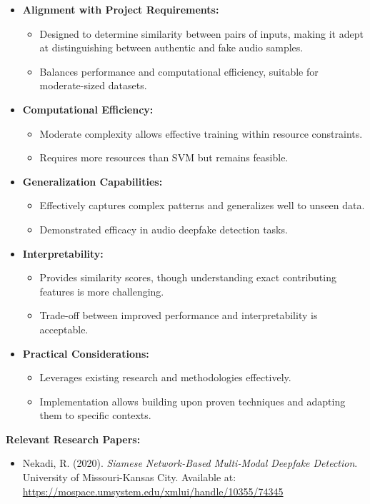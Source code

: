 \documentclass{article}
\begin{document}
\begin{itemize}
    \item \textbf{Alignment with Project Requirements:}
    \begin{itemize}
        \item Designed to determine similarity between pairs of inputs, making it adept at distinguishing between authentic and fake audio samples.
        \item Balances performance and computational efficiency, suitable for moderate-sized datasets.
    \end{itemize}
    \item \textbf{Computational Efficiency:}
    \begin{itemize}
        \item Moderate complexity allows effective training within resource constraints.
        \item Requires more resources than SVM but remains feasible.
    \end{itemize}
    \item \textbf{Generalization Capabilities:}
    \begin{itemize}
        \item Effectively captures complex patterns and generalizes well to unseen data.
        \item Demonstrated efficacy in audio deepfake detection tasks.
    \end{itemize}
    \item \textbf{Interpretability:}
    \begin{itemize}
        \item Provides similarity scores, though understanding exact contributing features is more challenging.
        \item Trade-off between improved performance and interpretability is acceptable.
    \end{itemize}
    \item \textbf{Practical Considerations:}
    \begin{itemize}
        \item Leverages existing research and methodologies effectively.
        \item Implementation allows building upon proven techniques and adapting them to specific contexts.
    \end{itemize}
\end{itemize}

\noindent
\textbf{Relevant Research Papers:}
\begin{itemize}
    \item Nekadi, R. (2020). \textit{Siamese Network-Based Multi-Modal Deepfake Detection}. University of Missouri-Kansas City. Available at: \url{https://mospace.umsystem.edu/xmlui/handle/10355/74345}
\end{itemize}
\end{document}

